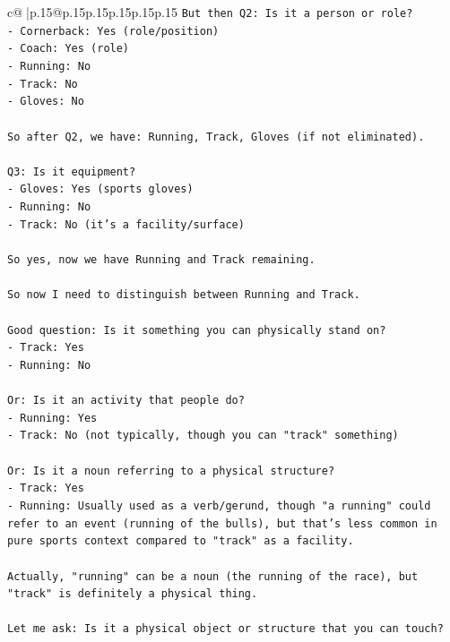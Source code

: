 \documentclass{article}
\begin{document}
{\begin{supertabular}{c@{$\;$}|p{.15\linewidth}@{}p{.15\linewidth}p{.15\linewidth}p{.15\linewidth}p{.15\linewidth}p{.15\linewidth}}
{{{\texttt{But then Q2: Is it a person or role?} \\
\texttt{{-} Cornerback: Yes (role/position)} \\
\texttt{{-} Coach: Yes (role)} \\
\texttt{{-} Running: No} \\
\texttt{{-} Track: No} \\
\texttt{{-} Gloves: No} \\
\\ 
\texttt{So after Q2, we have: Running, Track, Gloves (if not eliminated).} \\
\\ 
\texttt{Q3: Is it equipment?} \\
\texttt{{-} Gloves: Yes (sports gloves)} \\
\texttt{{-} Running: No} \\
\texttt{{-} Track: No (it's a facility/surface)} \\
\\ 
\texttt{So yes, now we have Running and Track remaining.} \\
\\ 
\texttt{So now I need to distinguish between Running and Track.} \\
\\ 
\texttt{Good question: Is it something you can physically stand on?} \\
\texttt{{-} Track: Yes} \\
\texttt{{-} Running: No} \\
\\ 
\texttt{Or: Is it an activity that people do?} \\
\texttt{{-} Running: Yes} \\
\texttt{{-} Track: No (not typically, though you can "track" something)} \\
\\ 
\texttt{Or: Is it a noun referring to a physical structure?} \\
\texttt{{-} Track: Yes} \\
\texttt{{-} Running: Usually used as a verb/gerund, though "a running" could refer to an event (running of the bulls), but that's less common in pure sports context compared to "track" as a facility.} \\
\\ 
\texttt{Actually, "running" can be a noun (the running of the race), but "track" is definitely a physical thing.} \\
\\ 
\texttt{Let me ask: Is it a physical object or structure that you can touch?} \\
}}}
\end{supertabular}}
\end{document}
